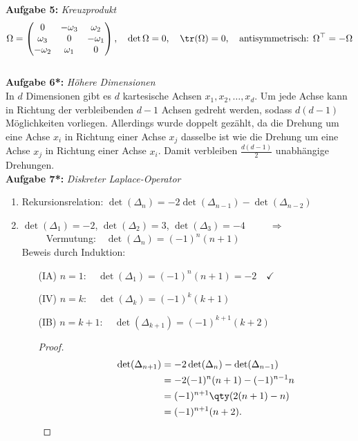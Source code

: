 \textbf{Aufgabe 5: } \emph{Kreuzprodukt}
\begin{align*}
\Omega=\begin{pmatrix}0 & -\omega_3 & \omega_2\\
\omega_3 & 0 & -\omega_1 \\
-\omega_2 & \omega_1 & 0
\end{pmatrix}, \quad \det\Omega=0, \quad \tr(\Omega)=0, \quad \text{antisymmetrisch: }\Omega^\top=-\Omega
\end{align*}\\[0.5cm]
%
\textbf{Aufgabe 6*: } \emph{Höhere Dimensionen}\\[0.2cm]
In $d$ Dimensionen gibt es $d$ kartesische Achsen $x_1,x_2,\dots,x_d$. Um jede Achse kann in Richtung der verbleibenden $d-1$ Achsen gedreht werden, sodass $d(d-1)$ Möglichkeiten vorliegen. Allerdings wurde doppelt gezählt, da die Drehung um eine Achse $x_i$ in Richtung einer Achse $x_j$ dasselbe ist wie die Drehung um eine Achse $x_j$ in Richtung einer Achse $x_i$. Damit verbleiben $\frac{d(d-1)}{2}$ unabhängige Drehungen.\\[1cm]
%
\textbf{Aufgabe 7*: } \emph{Diskreter Laplace-Operator}
\begin{enumerate}
\item Rekursionsrelation: $\det(\Delta_n)=-2\det(\Delta_{n-1})-\det(\Delta_{n-2})$
\item $\det(\Delta_1)=-2$, $\det(\Delta_2)=3$, $\det(\Delta_3)=-4$\ \ \ \ \  $\Rightarrow$\ \ \ \ \  Vermutung:\ \ $\det(\Delta_n)=(-1)^n(n+1)$\\[0.3cm]
Beweis durch Induktion:
\begin{enumerate}
    \item[(IA)] $n=1: \quad \det(\Delta_1) = (-1)^n (n+1) = -2 \quad\checkmark$ 
    \item[(IV)] $n=k: \quad \det(\Delta_k) = (-1)^k (k+1)$
    \item[(IB)] $n=k+1: \quad \det(\Delta_{k+1}) = (-1)^{k+1} (k+2)$\\
    \begin{proof}$~$\\[-1.45cm]
        \begin{align}
            \qquad \det(\Delta_{n+1})&=-2\det(\Delta_{n})-\det(\Delta_{n-1})\\
            &=-2(-1)^n (n+1)-(-1)^{n-1}n\\
            &=(-1)^{n+1}\qty(2(n+1)-n)\\
            &=(-1)^{n+1}(n+2).
        \end{align}
    \end{proof}
\end{enumerate}
\end{enumerate}